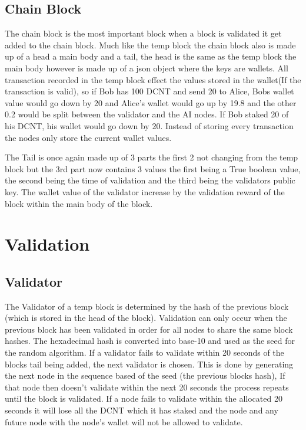\documentclass[11pt]{article}
\begin{document}
\subsection{Chain Block}
The chain block is the most important block when a block is validated it get added to the chain block. Much like the temp block the chain block also is made up of a head a main body and a tail, the head is the same as the temp block the main body however is made up of a json object where the keys are wallets. All transaction recorded in the temp block effect the values stored in the wallet(If the transaction is valid), so if Bob has 100 DCNT and send 20 to Alice, Bobs wallet value would go down by 20 and Alice's wallet would go up by 19.8 and the other 0.2 would be split between the validator and the AI nodes. If Bob staked 20 of his DCNT, his wallet would go down by 20. Instead of storing every transaction the nodes only store the current wallet values. 

The Tail is once again made up of 3 parts the first 2 not changing from the temp block but the 3rd part now contains 3 values the first being a True boolean value, the second being the time of validation and the third being the validators public key. The wallet value of the validator increase by the validation reward of the block within the main body of the block.



\section{Validation}
\subsection{Validator}
The Validator of a temp block is determined by the hash of the previous block (which is stored in the head of the block). Validation can only occur when the previous block has been validated in order for all nodes to share the same block hashes. The hexadecimal hash is converted into base-10 and used as the seed for the random algorithm. If a validator fails to validate within 20 seconds of the blocks tail being added, the next validator is chosen. This is done by generating the next node in the sequence based of the seed (the previous blocks hash), If that node then doesn't validate within the next 20 seconds the process repeats until the block is validated. If a node fails to validate within the allocated 20 seconds it will lose all the DCNT which it has staked and the node and any future node with the node's wallet will not be allowed to validate.
\end{document}
